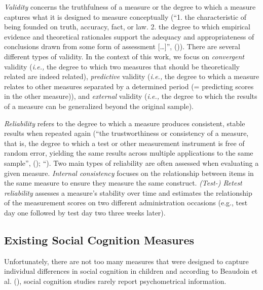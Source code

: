 \documentclass[
]{scrbook}
\begin{document}
\emph{Validity} concerns the truthfulness of a measure or the degree to which a measure captures what it is designed to measure conceptually (``1. the characteristic of being founded on truth, accuracy, fact, or law. 2. the degree to which empirical evidence and theoretical rationales support the adequacy and appropriateness of conclusions drawn from some form of assessment {[}\ldots{]}'', ()). There are several different types of validity. In the context of this work, we focus on \emph{convergent} validity (\emph{i.e.,} the degree to which two measures that should be theoretically related are indeed related), \emph{predictive} validity (\emph{i.e.,} the degree to which a measure relates to other measures separated by a determined period (= predicting scores in the other measure)), and \emph{external} validity (\emph{i.e.,} the degree to which the results of a measure can be generalized beyond the original sample).

\emph{Reliability} refers to the degree to which a measure produces consistent, stable results when repeated again (``the trustworthiness or consistency of a measure, that is, the degree to which a test or other measurement instrument is free of random error, yielding the same results across multiple applications to the same sample'', (); ``). Two main types of reliability are often assessed when evaluating a given measure. \emph{Internal consistency} focuses on the relationship between items in the same measure to ensure they measure the same construct. \emph{(Test-) Retest reliability} assesses a measure's stability over time and estimates the relationship of the measurement scores on two different administration occasions (e.g., test day one followed by test day two three weeks later).

\subsection{Existing Social Cognition Measures}\label{existing-social-cognition-measures}

Unfortunately, there are not too many measures that were designed to capture individual differences in social cognition in children and according to Beaudoin et al. (), social cognition studies rarely report psychometrical information.
\end{document}
